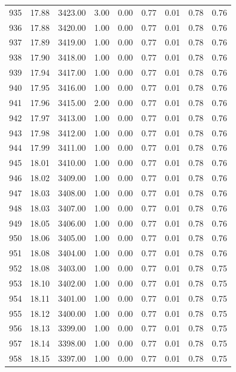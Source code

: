 \documentclass{article}\usepackage[]{graphicx}\usepackage[]{color}
\begin{document}
\begin{longtable}{rrrrrrrrr}
  935 & 17.88 & 3423.00 & 3.00 & 0.00 & 0.77 & 0.01 & 0.78 & 0.76 \\ 
  936 & 17.88 & 3420.00 & 1.00 & 0.00 & 0.77 & 0.01 & 0.78 & 0.76 \\ 
  937 & 17.89 & 3419.00 & 1.00 & 0.00 & 0.77 & 0.01 & 0.78 & 0.76 \\ 
  938 & 17.90 & 3418.00 & 1.00 & 0.00 & 0.77 & 0.01 & 0.78 & 0.76 \\ 
  939 & 17.94 & 3417.00 & 1.00 & 0.00 & 0.77 & 0.01 & 0.78 & 0.76 \\ 
  940 & 17.95 & 3416.00 & 1.00 & 0.00 & 0.77 & 0.01 & 0.78 & 0.76 \\ 
  941 & 17.96 & 3415.00 & 2.00 & 0.00 & 0.77 & 0.01 & 0.78 & 0.76 \\ 
  942 & 17.97 & 3413.00 & 1.00 & 0.00 & 0.77 & 0.01 & 0.78 & 0.76 \\ 
  943 & 17.98 & 3412.00 & 1.00 & 0.00 & 0.77 & 0.01 & 0.78 & 0.76 \\ 
  944 & 17.99 & 3411.00 & 1.00 & 0.00 & 0.77 & 0.01 & 0.78 & 0.76 \\ 
  945 & 18.01 & 3410.00 & 1.00 & 0.00 & 0.77 & 0.01 & 0.78 & 0.76 \\ 
  946 & 18.02 & 3409.00 & 1.00 & 0.00 & 0.77 & 0.01 & 0.78 & 0.76 \\ 
  947 & 18.03 & 3408.00 & 1.00 & 0.00 & 0.77 & 0.01 & 0.78 & 0.76 \\ 
  948 & 18.03 & 3407.00 & 1.00 & 0.00 & 0.77 & 0.01 & 0.78 & 0.76 \\ 
  949 & 18.05 & 3406.00 & 1.00 & 0.00 & 0.77 & 0.01 & 0.78 & 0.76 \\ 
  950 & 18.06 & 3405.00 & 1.00 & 0.00 & 0.77 & 0.01 & 0.78 & 0.76 \\ 
  951 & 18.08 & 3404.00 & 1.00 & 0.00 & 0.77 & 0.01 & 0.78 & 0.76 \\ 
  952 & 18.08 & 3403.00 & 1.00 & 0.00 & 0.77 & 0.01 & 0.78 & 0.75 \\ 
  953 & 18.10 & 3402.00 & 1.00 & 0.00 & 0.77 & 0.01 & 0.78 & 0.75 \\ 
  954 & 18.11 & 3401.00 & 1.00 & 0.00 & 0.77 & 0.01 & 0.78 & 0.75 \\ 
  955 & 18.12 & 3400.00 & 1.00 & 0.00 & 0.77 & 0.01 & 0.78 & 0.75 \\ 
  956 & 18.13 & 3399.00 & 1.00 & 0.00 & 0.77 & 0.01 & 0.78 & 0.75 \\ 
  957 & 18.14 & 3398.00 & 1.00 & 0.00 & 0.77 & 0.01 & 0.78 & 0.75 \\ 
  958 & 18.15 & 3397.00 & 1.00 & 0.00 & 0.77 & 0.01 & 0.78 & 0.75 \\ 

\end{longtable}
\end{document}
